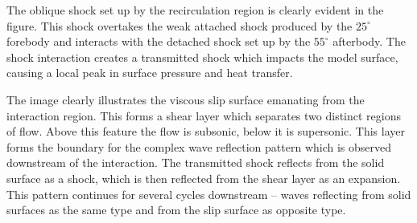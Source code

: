 The oblique shock set up by the recirculation region is clearly evident in the figure.  This shock overtakes the weak attached shock produced by the $25^\circ$ forebody and interacts with the detached shock set up by the $55^\circ$ afterbody.  The shock interaction creates a transmitted shock which impacts the model surface, causing a local peak in surface pressure and heat transfer.

The image clearly illustrates the viscous slip surface emanating from the interaction region.  This forms a shear layer which separates two distinct regions of flow.  Above this feature the flow is subsonic, below it is supersonic.  This layer forms the boundary for the complex wave reflection pattern which is observed downstream of the interaction.  The transmitted shock reflects from the solid surface as a shock, which is then reflected from the shear layer as an expansion.  This pattern continues for several cycles downstream -- waves reflecting from solid surfaces as the same type and from the slip surface as opposite type.     


